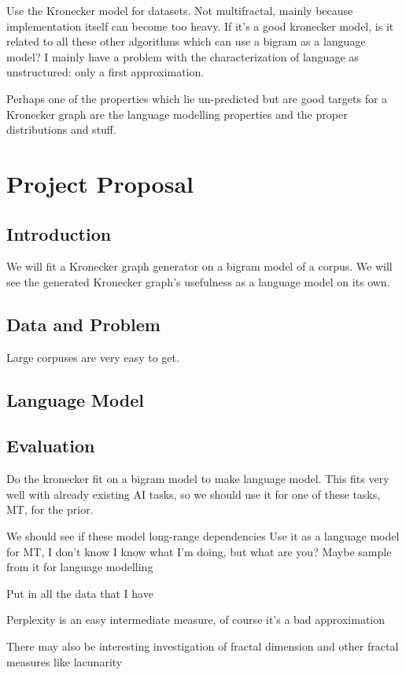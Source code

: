 \documentclass[12pt]{article}
\begin{document}
Use the Kronecker model for datasets. Not multifractal, mainly because implementation itself can become too heavy. If it's a good kronecker model, is it related to all these other algorithms which can use a bigram as a language model? I mainly have a problem with the characterization of language as unstructured: only a first approximation.

Perhaps one of the properties which lie un-predicted but are good targets for a Kronecker graph are the language modelling properties and the proper distributions and stuff.

\section{Project Proposal}

\subsection{Introduction}
We will fit a Kronecker graph generator on a bigram model of a corpus. We will see the generated Kronecker graph's usefulness as a language model on its own.
\subsection{Data and Problem}
Large corpuses are very easy to get. %
\subsection{Language Model}
\subsection{Evaluation}
Do the kronecker fit on a bigram model to make language model. This fits very well with already existing AI tasks, so we should use it for one of these tasks, MT, for the prior.

We should see if these model long-range dependencies
Use it as a language model for MT, I don't know
I know what I'm doing, but what are you?
Maybe sample from it for language modelling

Put in all the data that I have

Perplexity is an easy intermediate measure, of course it's a bad approximation

There may also be interesting investigation of fractal dimension and other fractal measures like lacunarity

\end{document}

